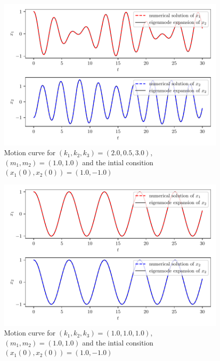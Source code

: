         \begin{figure}[H]
            \centering
            \includegraphics[width=0.9\linewidth]{../Numerical-Calculation/img/(k1,k2,k3)=(2.0,0.5,3.0),(m1,m2)=(1.0,1.0),(x1_i,x1_2)=(1.0,-1.0).pdf}
            \caption{Motion curve for $\left(k_1,k_2,k_3\right)=\left(2.0,0.5,3.0\right)$, $\left(m_1,m_2\right)=\left(1.0,1.0\right)$ and the intial consition $\left(x_{1}(0),x_2(0)\right)=\left(1.0,-1.0\right)$}
        \end{figure}

        \begin{figure}[H]
            \centering
            \includegraphics[width=0.9\linewidth]{../Numerical-Calculation/img/(k1,k2,k3)=(1.0,1.0,1.0),(m1,m2)=(1.0,1.0),(x1_i,x1_2)=(1.0,1.0).pdf}
            \caption{Motion curve for $\left(k_1,k_2,k_3\right)=\left(1.0,1.0,1.0\right)$, $\left(m_1,m_2\right)=\left(1.0,1.0\right)$ and the intial consition $\left(x_{1}(0),x_2(0)\right)=\left(1.0,-1.0\right)$}
        \end{figure}
